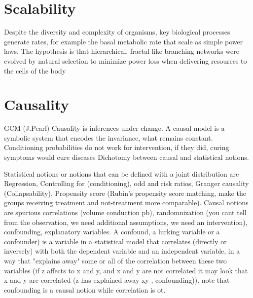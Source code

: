 \documentclass[onecollarge,runningheads]{svjour2}
\begin{document}
\section{Scalability}
Despite the diversity and complexity of organisms, key biological processes generate rates, for example the basal metabolic rate that scale as simple power laws. The hypothesis is that hierarchical, fractal-like branching networks were evolved by natural selection to minimize power loss when delivering resources to the cells of the body %

\section{Causality}
GCM (J.Pearl) Causality is inferences under change. A causal model is a symbolic system that encodes the invariance, what remains constant.
Conditioning probabilities do not work for intervention, if they did, curing symptoms would cure diseases
Dichotomy between causal and statistical notions.

Statistical notions or notions that can be defined with a joint distribution are Regression, Controlling for (conditioning), odd and risk ratios, Granger causality (Collapsability), Propensity score (Rubin's propensity score matching, make the groups receiving treatment and not-treatment more comparable).
Causal notions are spurious correlations (volume conduction pb), randomnization (you cant tell from the observation, we need additional assumptions, we need an intervention), confounding, explanatory variables.
A confound, a lurking variable or a confounder) is a variable in a statistical model that correlates (directly or inversely) with both the dependent variable and an independent variable,  in a way that "explains away" some or all of the correlation between these two variables (if z affects to x and y, and x and y are not correlated it may look that x and y are correlated (z has explained away xy , confounding)). note that confounding is a causal notion while correlation is ot.
\end{document}
